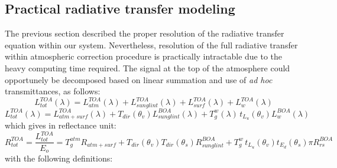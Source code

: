 \documentclass{article}
\begin{document}
\subsection{Practical radiative transfer modeling}\label{sec:practical_rt}
The previous section described the proper resolution of the radiative transfer equation within our system. Nevertheless, resolution of the full radiative transfer within atmospheric correction procedure is practically intractable due to the heavy computing time required. The signal at the top of the atmosphere could opportunely be decomposed based on linear summation and use of \textit{ad hoc} transmittances, as follows: 
\begin{equation}
    L_{tot}^{TOA}(\lambda) = L_{atm}^{TOA}(\lambda) + L_{sunglint}^{TOA}(\lambda)+ L_{surf}^{TOA}(\lambda) + L_{w}^{TOA}(\lambda)
\label{eq:placeholder}
\end{equation}
\begin{equation}
    L_{tot}^{TOA}(\lambda) = L_{atm+surf}^{TOA}(\lambda) + T_{dir}(\theta_v)L_{sunglint}^{BOA}(\lambda) + T_g^{w}(\lambda)\,t_{L_u}(\theta_v)L_{w}^{BOA}(\lambda)
\label{eq:placeholder}
\end{equation}
which gives in reflectance unit:
\begin{equation}
    R_{tot}^{TOA} =\frac{L_{tot}^{TOA}}{E_o} = T_g^{atm} R_{atm+surf} + T_{dir}(\theta_v)T_{dir}({\theta_s})R_{sunglint}^{BOA} + T_g^{w}\,t_{L_u}(\theta_v)t_{E_d}(\theta_s)\pi R_{rs}^{BOA}
\label{eq:placeholder}
\end{equation}
with the following definitions:
\end{document}
